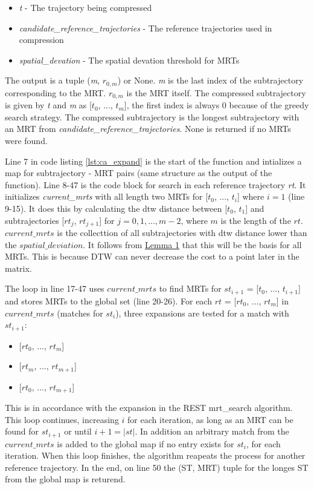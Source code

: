 

\begin{itemize}
    \item{\textit{t} - The trajectory being compressed}
    \item{\textit{candidate\_reference\_trajectories} - The reference trajectories used in compression}
    \item{\textit{spatial\_devation} - The spatial devation threshold for MRTs}
\end{itemize}

The output is a tuple (\textit{m}, $r_{0,m}$) or None. \textit{m} is the last index of the subtrajectory corresponding to the MRT. $r_{0,m}$ is the MRT itself. The compressed subtrajectory is given by \textit{t} and \textit{m} as [$t_0$, ..., $t_m$], the first index is always 0 because of the greedy search strategy. The compressed subtrajectory is the longest subtrajectory with an MRT from \textit{candidate\_reference\_trajectories}. None is returned if no MRTs were found.

Line 7 in code listing \ref{lst:ca_expand} is the start of the function and intializes a map for subtrajectory - MRT pairs (same structure as the output of the function). Line 8-47 is the code block for search in each reference trajectory \textit{rt}. It initializes \textit{current\_mrts} with all length two MRTs for [$t_0$, ..., $t_i$] where $i = 1$ (line 9-15). It does this by calculating the dtw distance between [$t_0$, $t_1$] and subtrajectories [$rt_j$, $rt_{j+1}$] for $j = 0, 1, ..., m-2$, where $m$ is the length of the $rt$. $current\_mrts$ is the collecttion of all subtrajectories with dtw distance lower than the $spatial\_deviation$. It follows from \hyperref[lemma]{Lemma 1} that this will be the basis for all MRTs. This is because DTW can never decrease the cost to a point later in the matrix.

The loop in line 17-47 uses $current\_mrts$ to find MRTs for $st_{i+1}$ = [$t_0$, ..., $t_{i+1}$] and stores MRTs to the global set (line 20-26). For each $rt$ = [$rt_0$, ..., $rt_m$] in $current\_mrts$ (matches for $st_i$), three expansions are tested for a match with $st_{i+1}$:
\begin{itemize}
    \item {[$rt_0$, ..., $rt_m$]}
    \item {[$rt_m$, ..., $rt_{m+1}$]}
    \item {[$rt_0$, ..., $rt_{m+1}$]}
\end{itemize}
This is in accordance with the expansion in the REST mrt\_search algorithm. This loop continues, increasing $i$ for each iteration, as long as an MRT can be found for $st_{i+1}$ or until $i+1 = |st|$. In addition an arbitrary match from the $current\_mrts$ is added to the global map if no entry exists for $st_{i}$, for each iteration. When this loop finishes, the algorithm reapeats the process for another reference trajectory. In the end, on line 50 the (ST, MRT) tuple for the longes ST from the global map is returend.

